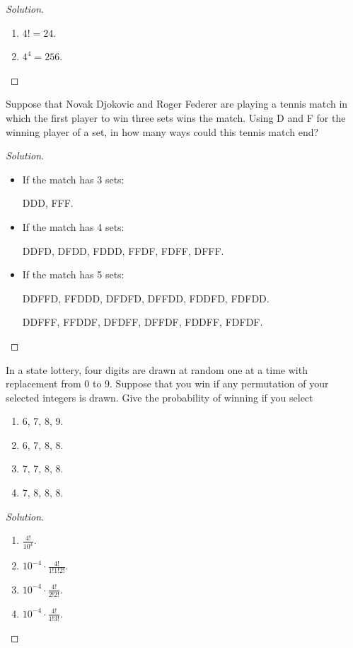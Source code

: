 \documentclass[class=probandstats,crop=false]{standalone}
\begin{document}
\begin{proof}[Solution]
    \begin{enumerate}[label = \textbf{(\alph*)}]
        \item $4! = 24$.
        \item $4^{4} = 256$.
    \end{enumerate}
\end{proof}

\begin{exercise}
    \par Suppose that Novak Djokovic and Roger Federer are playing a tennis match in which the first player to win three sets wins the match. Using D and F for the winning player of a set, in how many ways could this tennis match end?
\end{exercise}

\begin{proof}[Solution]
    \begin{itemize}
        \item If the match has 3 sets:
              \par DDD, FFF.
        \item If the match has 4 sets:
              \par DDFD, DFDD, FDDD, FFDF, FDFF, DFFF.
        \item If the match has 5 sets:
              \par DDFFD, FFDDD, DFDFD, DFFDD, FDDFD, FDFDD.
              \par DDFFF, FFDDF, DFDFF, DFFDF, FDDFF, FDFDF.
    \end{itemize}
\end{proof}

\begin{exercise}
    \par In a state lottery, four digits are drawn at random one at a time with replacement from 0 to 9. Suppose that you win if any permutation of your selected integers is drawn. Give the probability of winning if you select
    \begin{enumerate}[label = \textbf{(\alph*)}]
        \item 6, 7, 8, 9.
        \item 6, 7, 8, 8.
        \item 7, 7, 8, 8.
        \item 7, 8, 8, 8.
    \end{enumerate}
\end{exercise}

\begin{proof}[Solution]
    \begin{enumerate}[label = \textbf{(\alph*)}]
        \item $\frac{4!}{10^{4}}$.
        \item $10^{-4}\cdot\frac{4!}{1!1!2!}$.
        \item $10^{-4}\cdot\frac{4!}{2!2!}$.
        \item $10^{-4}\cdot\frac{4!}{1!3!}$.
    \end{enumerate}
\end{proof}
\end{document}
